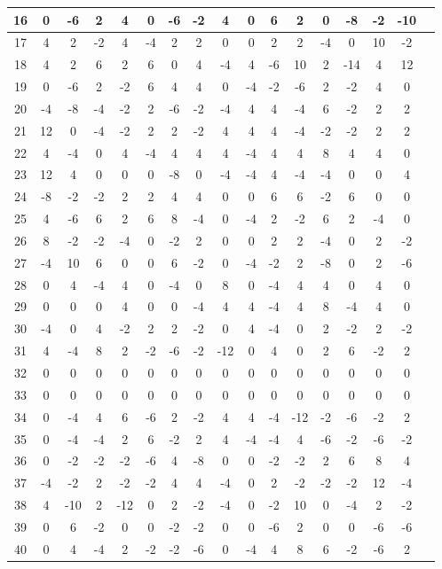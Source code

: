 \begin{tabular}{c||c|c|c|c|c|c|c|c|c|c|c|c|c|c|c|c}
\hline
16 & 0 & -6 & 2 & 4 & 0 & -6 & -2 & 4 & 0 & 6 & 2 & 0 & -8 & -2 & -10 \\
\hline
17 & 4 & 2 & -2 & 4 & -4 & 2 & 2 & 0 & 0 & 2 & 2 & -4 & 0 & 10 & -2 \\
\hline
18 & 4 & 2 & 6 & 2 & 6 & 0 & 4 & -4 & 4 & -6 & 10 & 2 & -14 & 4 & 12 \\
\hline
19 & 0 & -6 & 2 & -2 & 6 & 4 & 4 & 0 & -4 & -2 & -6 & 2 & -2 & 4 & 0 \\
\hline
20 & -4 & -8 & -4 & -2 & 2 & -6 & -2 & -4 & 4 & 4 & -4 & 6 & -2 & 2 & 2 \\
\hline
21 & 12 & 0 & -4 & -2 & 2 & 2 & -2 & 4 & 4 & 4 & -4 & -2 & -2 & 2 & 2 \\
\hline
22 & 4 & -4 & 0 & 4 & -4 & 4 & 4 & 4 & -4 & 4 & 4 & 8 & 4 & 4 & 0 \\
\hline
23 & 12 & 4 & 0 & 0 & 0 & -8 & 0 & -4 & -4 & 4 & -4 & -4 & 0 & 0 & 4 \\
\hline
24 & -8 & -2 & -2 & 2 & 2 & 4 & 4 & 0 & 0 & 6 & 6 & -2 & 6 & 0 & 0 \\
\hline
25 & 4 & -6 & 6 & 2 & 6 & 8 & -4 & 0 & -4 & 2 & -2 & 6 & 2 & -4 & 0 \\
\hline
26 & 8 & -2 & -2 & -4 & 0 & -2 & 2 & 0 & 0 & 2 & 2 & -4 & 0 & 2 & -2 \\
\hline
27 & -4 & 10 & 6 & 0 & 0 & 6 & -2 & 0 & -4 & -2 & 2 & -8 & 0 & 2 & -6 \\
\hline
28 & 0 & 4 & -4 & 4 & 0 & -4 & 0 & 8 & 0 & -4 & 4 & 4 & 0 & 4 & 0 \\
\hline
29 & 0 & 0 & 0 & 4 & 0 & 0 & -4 & 4 & 4 & -4 & 4 & 8 & -4 & 4 & 0 \\
\hline
30 & -4 & 0 & 4 & -2 & 2 & 2 & -2 & 0 & 4 & -4 & 0 & 2 & -2 & 2 & -2 \\
\hline
31 & 4 & -4 & 8 & 2 & -2 & -6 & -2 & -12 & 0 & 4 & 0 & 2 & 6 & -2 & 2 \\
\hline
32 & 0 & 0 & 0 & 0 & 0 & 0 & 0 & 0 & 0 & 0 & 0 & 0 & 0 & 0 & 0 \\
\hline
33 & 0 & 0 & 0 & 0 & 0 & 0 & 0 & 0 & 0 & 0 & 0 & 0 & 0 & 0 & 0 \\
\hline
34 & 0 & -4 & 4 & 6 & -6 & 2 & -2 & 4 & 4 & -4 & -12 & -2 & -6 & -2 & 2 \\
\hline
35 & 0 & -4 & -4 & 2 & 6 & -2 & 2 & 4 & -4 & -4 & 4 & -6 & -2 & -6 & -2 \\
\hline
36 & 0 & -2 & -2 & -2 & -6 & 4 & -8 & 0 & 0 & -2 & -2 & 2 & 6 & 8 & 4 \\
\hline
37 & -4 & -2 & 2 & -2 & -2 & 4 & 4 & -4 & 0 & 2 & -2 & -2 & -2 & 12 & -4 \\
\hline
38 & 4 & -10 & 2 & -12 & 0 & 2 & -2 & -4 & 0 & -2 & 10 & 0 & -4 & 2 & -2 \\
\hline
39 & 0 & 6 & -2 & 0 & 0 & -2 & -2 & 0 & 0 & -6 & 2 & 0 & 0 & -6 & -6 \\
\hline
40 & 0 & 4 & -4 & 2 & -2 & -2 & -6 & 0 & -4 & 4 & 8 & 6 & -2 & -6 & 2 
    \end{tabular}
    
